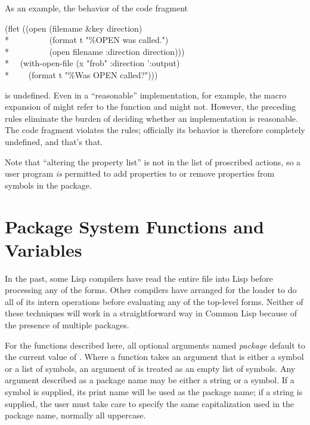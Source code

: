 \begin{newer}
As an example, the behavior of the code fragment
\begin{lisp}
(flet ((open (filename \&key direction) \\*
~~~~~~~~~(format t "{\Xtilde}\%OPEN was called.")  \\*
~~~~~~~~~(open filename :direction direction))) \\*
~~(with-open-file (x "frob" :direction ':output)  \\*
~~~~(format t "{\Xtilde}\%Was OPEN called?")))
\end{lisp}
is undefined.  Even in a ``reasonable'' implementation,
for example, the macro expansion of  might refer
to the  function and might not.  However, the preceding rules eliminate
the burden of deciding whether an implementation is reasonable. The code
fragment violates the rules; officially its behavior is therefore
completely undefined, and that's that.

Note that ``altering the property list'' is not in the list of
proscribed actions, so a user program \emph{is} permitted to
add properties to or remove properties from
symbols in the  package.
\end{newer}

\section{Package System Functions and Variables}
\label{PACKAGE-FUNCTIONS-SECTION}

\beforenoterule
\begin{implementation}
In the past, some Lisp compilers have read
the entire file into Lisp before processing any of the forms.  
Other compilers have arranged for
the loader to do all of its intern operations before evaluating any of the
top-level forms.  Neither of these techniques will work in a
straightforward way in Common Lisp because of the presence of multiple
packages.
\end{implementation}
\afternoterule

For the functions described here, all optional arguments named
\emph{package} default to the current value of .  Where a
function takes an argument that is either a symbol or a list of symbols,
an argument of {\false} is treated as an empty list of symbols.  Any
argument described as a package name may be either a string or a symbol.
If a symbol is supplied, its print name will be used as the package
name; if a string is supplied, the user must take care to specify the
same capitalization used in the package name, normally all uppercase.

